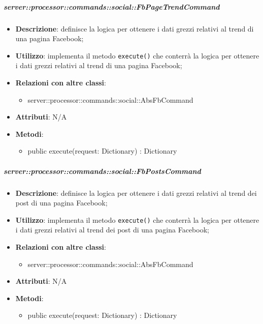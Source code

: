         \subparagraph{server::processor::commands::social::FbPageTrendCommand} %
        \label{subp:bdsm_app_server_processor_commands_social_fbpagetrendcommand}
        \begin{itemize}
          \item \textbf{Descrizione}: definisce la logica per ottenere i dati grezzi relativi al trend di una pagina Facebook;
          \item \textbf{Utilizzo}: implementa il metodo \texttt{execute()} che conterrà la logica per ottenere i dati grezzi relativi al trend di una pagina Facebook;
          \item \textbf{Relazioni con altre classi}:
            \begin{itemize}
              \item server::processor::commands::social::AbsFbCommand
            \end{itemize}
			\item \textbf{Attributi}: N/A
			\item \textbf{Metodi}:
        	\begin{itemize}
          		\item public execute(request: Dictionary) : Dictionary
        	\end{itemize}
        \end{itemize}

        \subparagraph{server::processor::commands::social::FbPostsCommand} %
        \label{subp:bdsm_app_server_processor_commands_social_fbpostscommand}
        \begin{itemize}
          \item \textbf{Descrizione}: definisce la logica per ottenere i dati grezzi relativi al trend dei post di una pagina Facebook;
          \item \textbf{Utilizzo}: implementa il metodo \texttt{execute()} che conterrà la logica per ottenere i dati grezzi relativi al trend dei post di una pagina Facebook;
          \item \textbf{Relazioni con altre classi}:
            \begin{itemize}
              \item server::processor::commands::social::AbsFbCommand
            \end{itemize}
            \item \textbf{Attributi}: N/A
			\item \textbf{Metodi}:
        	\begin{itemize}
          		\item public execute(request: Dictionary) : Dictionary
        	\end{itemize}
        \end{itemize}

